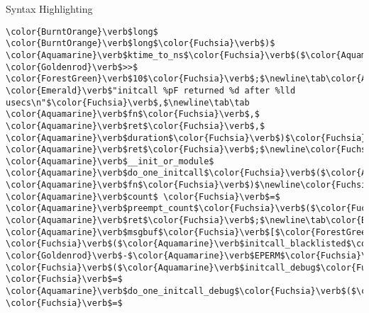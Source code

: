 \begin{frame}{Syntax Highlighting}
\begin{verbatim}
\color{BurntOrange}\verb$long$ \color{BurntOrange}\verb$long$\color{Fuchsia}\verb$)$ \color{Aquamarine}\verb$ktime_to_ns$\color{Fuchsia}\verb$($\color{Aquamarine}\verb$delta$\color{Fuchsia}\verb$)$ \color{Goldenrod}\verb$>>$ \color{ForestGreen}\verb$10$\color{Fuchsia}\verb$;$\newline\tab\color{Aquamarine}\verb$printk$\color{Fuchsia}\verb$($\color{Aquamarine}\verb$KERN_DEBUG$ \color{Emerald}\verb$"initcall %pF returned %d after %lld usecs\n"$\color{Fuchsia}\verb$,$\newline\tab\tab \color{Aquamarine}\verb$fn$\color{Fuchsia}\verb$,$ \color{Aquamarine}\verb$ret$\color{Fuchsia}\verb$,$ \color{Aquamarine}\verb$duration$\color{Fuchsia}\verb$)$\color{Fuchsia}\verb$;$\newline\newline\tab\color{BurntOrange}\verb$return$ \color{Aquamarine}\verb$ret$\color{Fuchsia}\verb$;$\newline\color{Fuchsia}\verb$}$\newline\newline\color{BurntOrange}\verb$int$ \color{Aquamarine}\verb$__init_or_module$ \color{Aquamarine}\verb$do_one_initcall$\color{Fuchsia}\verb$($\color{Aquamarine}\verb$initcall_t$ \color{Aquamarine}\verb$fn$\color{Fuchsia}\verb$)$\newline\color{Fuchsia}\verb${$\newline\tab\color{BurntOrange}\verb$int$ \color{Aquamarine}\verb$count$ \color{Fuchsia}\verb$=$ \color{Aquamarine}\verb$preempt_count$\color{Fuchsia}\verb$($\color{Fuchsia}\verb$)$\color{Fuchsia}\verb$;$\newline\tab\color{BurntOrange}\verb$int$ \color{Aquamarine}\verb$ret$\color{Fuchsia}\verb$;$\newline\tab\color{BurntOrange}\verb$char$ \color{Aquamarine}\verb$msgbuf$\color{Fuchsia}\verb$[$\color{ForestGreen}\verb$64$\color{Fuchsia}\verb$]$\color{Fuchsia}\verb$;$\newline\newline\tab\color{BurntOrange}\verb$if$ \color{Fuchsia}\verb$($\color{Aquamarine}\verb$initcall_blacklisted$\color{Fuchsia}\verb$($\color{Aquamarine}\verb$fn$\color{Fuchsia}\verb$)$\color{Fuchsia}\verb$)$\newline\tab\tab\color{BurntOrange}\verb$return$ \color{Goldenrod}\verb$-$\color{Aquamarine}\verb$EPERM$\color{Fuchsia}\verb$;$\newline\newline\tab\color{BurntOrange}\verb$if$ \color{Fuchsia}\verb$($\color{Aquamarine}\verb$initcall_debug$\color{Fuchsia}\verb$)$\newline\tab\tab\color{Aquamarine}\verb$ret$ \color{Fuchsia}\verb$=$ \color{Aquamarine}\verb$do_one_initcall_debug$\color{Fuchsia}\verb$($\color{Aquamarine}\verb$fn$\color{Fuchsia}\verb$)$\color{Fuchsia}\verb$;$\newline\tab\color{BurntOrange}\verb$else$\newline\tab\tab\color{Aquamarine}\verb$ret$ \color{Fuchsia}\verb$=$ 
\end{verbatim}
\end{frame}
